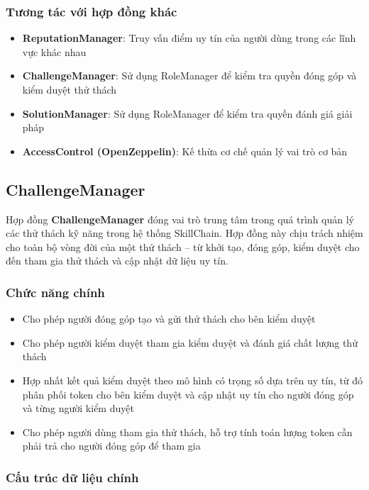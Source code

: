 \subsubsection{Tương tác với hợp đồng khác}

\begin{itemize}
  \item \textbf{ReputationManager}: Truy vấn điểm uy tín của người dùng trong các lĩnh vực khác nhau
  \item \textbf{ChallengeManager}: Sử dụng RoleManager để kiểm tra quyền đóng góp và kiểm duyệt thử thách
  \item \textbf{SolutionManager}: Sử dụng RoleManager để kiểm tra quyền đánh giá giải pháp
  \item \textbf{AccessControl (OpenZeppelin)}: Kế thừa cơ chế quản lý vai trò cơ bản
\end{itemize}

\subsection{ChallengeManager}

Hợp đồng \textbf{ChallengeManager} đóng vai trò trung tâm trong quá trình quản lý các thử thách kỹ năng trong hệ thống SkillChain.
Hợp đồng này chịu trách nhiệm cho toàn bộ vòng đời của một thử thách -- từ khởi tạo, đóng góp, kiểm duyệt cho đến tham gia thử thách và cập nhật dữ liệu uy tín.

\subsubsection{Chức năng chính}

\begin{itemize}
  \item Cho phép người đóng góp tạo và gửi thử thách cho bên kiểm duyệt
  \item Cho phép người kiểm duyệt tham gia kiểm duyệt và đánh giá chất lượng thử thách
  \item Hợp nhất kết quả kiểm duyệt theo mô hình có trọng số dựa trên uy tín, từ đó phân phối token cho bên kiểm duyệt và cập nhật uy tín cho người đóng góp và từng người kiểm duyệt
  \item Cho phép người dùng tham gia thử thách, hỗ trợ tính toán lượng token cần phải trả cho người đóng góp để tham gia
\end{itemize}

\subsubsection{Cấu trúc dữ liệu chính}

